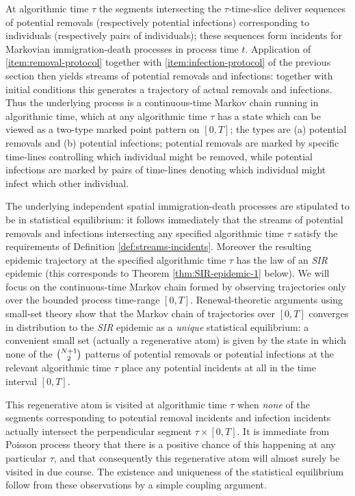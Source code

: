 \documentclass[]{article}
\newcommand{\Population}{N}
\newcommand{\SIR}{\emph{SIR}\xspace}
\begin{document}
At algorithmic time \(\tau\)
the segments intersecting the \(\tau\)-time-slice
deliver sequences of potential removals 
(respectively potential infections)
corresponding to 
individuals (respectively pairs of individuals);
these sequences form incidents for
Markovian immigration-death processes in process time \(t\).
Application of \ref{item:removal-protocol} together with \ref{item:infection-protocol}
of the previous section
then yields streams of potential removals and infections:
together with initial conditions this
generates a trajectory of actual removals and infections.
Thus the underlying
process 
is a continuous-time Markov chain running in algorithmic time,
which at any algorithmic time \(\tau\)
has a state which can be viewed as a two-type marked point pattern on \([0,T]\);
the types are (a) potential removals and (b) potential infections;
potential removals are marked by specific time-lines controlling which individual 
might be removed, 
while potential infections are marked by pairs of time-lines
denoting which individual might infect which other individual.%



The underlying independent spatial immigration-death processes are stipulated
to be in statistical equilibrium: it follows immediately that
the streams of potential removals and infections
intersecting any specified algorithmic time \(\tau\)
satisfy the requirements of 
Definition \ref{def:streams-incidents}. 
Moreover
the resulting epidemic trajectory 
at the specified algorithmic time \(\tau\)
has the law of an
\SIR epidemic
(this corresponds to
Theorem \ref{thm:SIR-epidemic-1} below).
We will focus on the continuous-time Markov chain formed by observing trajectories 
only over the bounded process time-range \([0,T]\).
Renewal-theoretic arguments using small-set theory 
show that the Markov chain of trajectories over \([0,T]\)  
converges 
in distribution
to the \SIR epidemic as a \emph{unique}
statistical equilibrium: a convenient small set
(actually a regenerative atom)
is given by the state in which none of
the \(\tbinom{\Population+1}{2}\) 
patterns of potential removals or potential infections
at the relevant algorithmic time \(\tau\)
place 
 any potential incidents at all in the time interval \([0,T]\).

This regenerative atom is visited at algorithmic time \(\tau\)
when \emph{none} of the segments corresponding to
potential removal incidents
and infection incidents actually intersect
the perpendicular segment
\(\tau\times[0,T]\). 
It is immediate from Poisson process theory
that there is a positive chance of this happening at any particular
\(\tau\),
and that
consequently this regenerative 
 atom will almost surely be visited in
 due course.
 The existence
 and uniqueness of the statistical equilibrium 
 follow 
 from these observations
 by a simple coupling argument.
\end{document}
